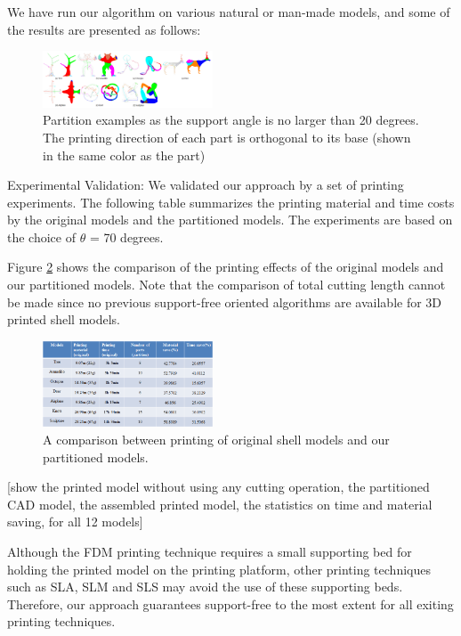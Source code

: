 We have run our algorithm on various natural or man-made models, and some of the results are presented as follows:

\begin{figure}[tbp]
  \centering
  \includegraphics[width=0.45\textwidth]{figs/programming result.png}
  \caption{\label{fig:programming result}%
           Partition examples as the support angle is no larger than 20 degrees. The printing direction of each part is orthogonal to its base (shown in the same color as the part)}
\end{figure}

Experimental Validation: We validated our approach by a set of printing experiments. The following table summarizes the printing material and time costs by the original models and the partitioned models. The experiments are based on the choice of $\theta$ = 70 degrees.


Figure \ref{fig:comparison} shows the comparison of the printing effects of the original models and our partitioned models. Note that the comparison of total cutting length cannot be made since no previous support-free oriented algorithms are available for 3D printed shell models.

\begin{figure}[tbp]
  \centering
  \includegraphics[width=0.45\textwidth]{figs/comparison.png}
  \caption{\label{fig:comparison}%
           A comparison between printing of original shell models and our partitioned models.}
\end{figure}




[show the printed model without using any cutting operation, the partitioned CAD model, the assembled printed model, the statistics on time and material saving, for all 12 models]

Although the FDM printing technique requires a small supporting bed for holding the printed model on the printing platform, other printing techniques such as SLA, SLM and SLS may avoid the use of these supporting beds. Therefore, our approach guarantees support-free to the most extent for all exiting printing techniques.

